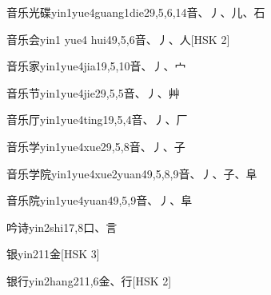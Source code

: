 \begin{entry}{音乐光碟}{yin1yue4guang1die2}{9,5,6,14}{⾳、⼃、⼉、⽯}
\end{entry}

\begin{entry}{音乐会}{yin1 yue4 hui4}{9,5,6}{⾳、⼃、⼈}[HSK 2]
\end{entry}

\begin{entry}{音乐家}{yin1yue4jia1}{9,5,10}{⾳、⼃、⼧}
\end{entry}

\begin{entry}{音乐节}{yin1yue4jie2}{9,5,5}{⾳、⼃、⾋}
\end{entry}

\begin{entry}{音乐厅}{yin1yue4ting1}{9,5,4}{⾳、⼃、⼚}
\end{entry}

\begin{entry}{音乐学}{yin1yue4xue2}{9,5,8}{⾳、⼃、⼦}
\end{entry}

\begin{entry}{音乐学院}{yin1yue4xue2yuan4}{9,5,8,9}{⾳、⼃、⼦、⾩}
\end{entry}

\begin{entry}{音乐院}{yin1yue4yuan4}{9,5,9}{⾳、⼃、⾩}
\end{entry}

\begin{entry}{吟诗}{yin2shi1}{7,8}{⼝、⾔}
\end{entry}

\begin{entry}{银}{yin2}{11}{⾦}[HSK 3]
\end{entry}

\begin{entry}{银行}{yin2hang2}{11,6}{⾦、⾏}[HSK 2]
\end{entry}

